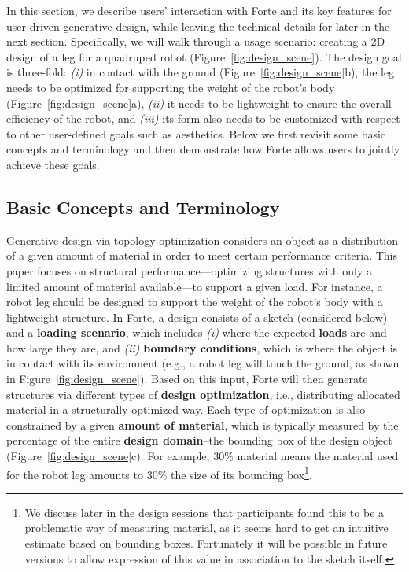 In this section, we describe users' interaction with Forte and its key features for user-driven generative design, while leaving the technical details for later in the next section. Specifically, we will walk through a usage scenario: creating a 2D design of a leg for a quadruped robot (Figure~\ref{fig:design_scene}). The design goal is three-fold: {\em (i)} in contact with the ground (Figure~\ref{fig:design_scene}b), the leg needs to be optimized for supporting the weight of the robot's body (Figure~\ref{fig:design_scene}a), {\em (ii)} it needs to be lightweight to ensure the overall efficiency of the robot, and {\em (iii)} its form also needs to be customized with respect to other user-defined goals such as aesthetics. Below we first revisit some basic concepts and terminology and then demonstrate how Forte allows users to jointly achieve these goals.

\subsection{Basic Concepts and Terminology}
Generative design via topology optimization considers an object as a distribution of a given amount of material in order to meet certain performance criteria. This paper focuses on structural performance---optimizing structures with only a limited amount of material available---to support a given load. For instance, a robot leg should be designed to support the weight of the robot's body with a lightweight structure. In Forte, a design consists of a sketch (considered below) and a \textbf{loading scenario}, which includes {\em(i)} where the expected \textbf{loads} are and how large they are, and {\em(ii)} \textbf{boundary conditions}, which is where the object is in contact with its environment (e.g., a robot leg will touch the ground, as shown in Figure~\ref{fig:design_scene}). Based on this input, Forte will then generate structures via different types of \textbf{design optimization}, i.e., distributing allocated material in a structurally optimized way. Each type of optimization is also constrained by a given \textbf{amount of material}, which is typically measured by the percentage of the entire \textbf{design domain}--the bounding box of the design object (Figure~\ref{fig:design_scene}c). For example, 30\% material means the material used for the robot leg amounts to 30\% the size of its bounding box\footnote{We discuss later in the design sessions that participants found this to be a problematic way of measuring material, as it seems hard to get an intuitive estimate based on bounding boxes. Fortunately it will be possible in future versions to allow expression of this value in association to the sketch itself.}.

